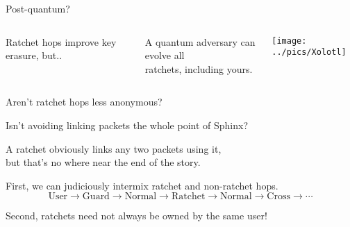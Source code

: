 \documentclass[fleqn,xcolor={usenames,dvipsnames}]{beamer}
\begin{document}
\begin{frame}{Post-quantum?}
\begin{columns}[T]
Ratchet hops improve key erasure, but..

\medskip

A quantum adversary can evolve all \\
 \hspace*{2pt} ratchets, including yours.

\medskip
{}

\texttt{[image: ../pics/Xolotl]}
\end{columns}
\end{frame}


\begin{frame}{Aren't ratchet hops less anonymous?}

Isn't avoiding linking packets the whole point of Sphinx?

\medskip

A ratchet obviously links any two packets using it, \\
\hspace*{2pt} but that's no where near the end of the story.

\bigskip

First, we can judiciously intermix ratchet and non-ratchet hops.
\[ \textrm{User} \to \textrm{Guard} \to \textrm{Normal} \to \textrm{Ratchet} \to \textrm{Normal} \to \textrm{Cross} \to \cdots \]

\smallskip
Second, ratchets need not always be owned by the same user!

\end{frame}
\end{document}
